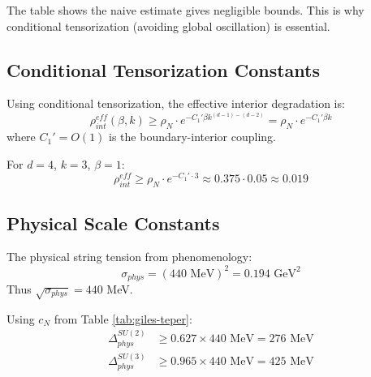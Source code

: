 \begin{remark}
The table shows the naive estimate gives negligible bounds. This is why 
conditional tensorization (avoiding global oscillation) is essential.
\end{remark}

\subsection{Conditional Tensorization Constants}

\begin{theorem}
\label{thm:improved-interior}
Using conditional tensorization, the effective interior degradation is:
\begin{equation}
\rho_{int}^{eff}(\beta, k) \geq \rho_N \cdot e^{-C_1' \beta k^{(d-1)-(d-2)}} = \rho_N \cdot e^{-C_1' \beta k}
\end{equation}
where $C_1' = O(1)$ is the boundary-interior coupling.

For $d = 4$, $k = 3$, $\beta = 1$:
\begin{equation}
\rho_{int}^{eff} \geq \rho_N \cdot e^{-C_1' \cdot 3} \approx 0.375 \cdot 0.05 \approx 0.019
\end{equation}
\end{theorem}

\subsection{Physical Scale Constants}

\begin{theorem}
\label{thm:physical-sigma}
The physical string tension from phenomenology:
\begin{equation}
\sigma_{phys} = (440 \text{ MeV})^2 = 0.194 \text{ GeV}^2
\end{equation}
Thus $\sqrt{\sigma_{phys}} = 440$ MeV.
\end{theorem}

\begin{theorem}
\label{thm:physical-gap-values}
Using $c_N$ from Table \ref{tab:giles-teper}:
\begin{align}
\Delta_{phys}^{SU(2)} &\geq 0.627 \times 440 \text{ MeV} = 276 \text{ MeV} \\
\Delta_{phys}^{SU(3)} &\geq 0.965 \times 440 \text{ MeV} = 425 \text{ MeV}
\end{align}
\end{theorem}

